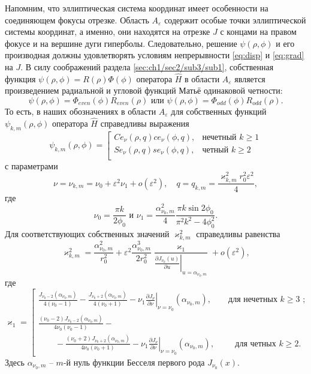 Напомним, что эллиптическая система координат имеет особенности на соединяющем фокусы отрезке. Область $A_\varepsilon$ содержит особые точки эллиптической системы координат, а именно, они находятся на отрезке $J$ с концами на правом фокусе и на вершине дуги гиперболы.
Следовательно, решение $\psi(\rho, \phi)$ и его производная должны удовлетворять условиям непрерывности \eqref{eq:disp} и \eqref{eq:grad} на  $J$.
В силу соображений раздела \ref{sec:ch1/sec2/sub3/sub1}, собственная функция  $\psi(\rho,\phi)=R(\rho) \Phi(\phi)$ оператора $\hat{H}$ в области $A_\varepsilon$ является произведением радиальной и угловой функций Матьё одинаковой четности:
$$ \psi(\rho,\phi) = \Phi_{even}(\phi) R_{even}(\rho)  
\text{ или }
 \psi(\rho,\phi) = \Phi_{odd}(\phi) R_{odd}(\rho) .  $$
То есть, в наших обозначениях в области $A_\varepsilon$ для собственных функций $\psi_{k, m}(\rho, \phi)$ оператора   $\hat{H}$ справедливы выражения
\begin{equation}
\psi_{k, m}(\rho, \phi) = 
\left[
\begin{array}{ll}
    Ce_\nu(\rho, q) ce_\nu(\phi, q) ,   &    \text{нечетный $k \geq 1$}\\
    Se_\nu(\rho, q) se_\nu(\phi, q) ,   &    \text{четный $k \geq 2$}\\
\end{array}
\right.\label{eq:fun}
\end{equation}
с параметрами
\[
\nu = \nu_{k,m} = \nu_0+ \varepsilon^2 \nu_1 + o(\varepsilon^2),  \quad q=q_{k,m} = \dfrac{\varkappa_{k,m}^2 r_0^2 \varepsilon^2}{4},
\]
где
$$\nu_0 = \frac{\pi k}{2\phi_0}\text{\ \  и\  \  }\nu_1=\frac{\alpha_{\nu_0, m}^2}{4} \frac{\pi k \sin 2\phi_0}{\pi^2 k^2 - 4\phi_0^2}  .$$
Для соответствующих собственных  значений  $\varkappa^2_{k, m}$ справедливы равенства
\begin{equation}
\varkappa^2_{k, m} = \dfrac{\alpha_{\nu_0, m}^2}{r_0^2} +
\varepsilon^2 \dfrac{\alpha_{\nu_0, m}^3}{2 r_0^2}\dfrac{\varkappa_1 }{ \left.\frac{\partial J_{\nu_0}(u)}{\partial u}\right|_{u=\alpha_{\nu_0, m}} } + o(\varepsilon^2),\label{eq:val}
\end{equation}
где
\begin{equation*}
    \varkappa_1 = 
    \left[
\begin{array}{ll}
\frac{J_{\nu_0-2}(\alpha_{\nu_0, m})}{4(\nu_0-1)} - \frac{J_{\nu_0+2}(\alpha_{\nu_0, m})}{4(\nu_0+1)} 
  - \nu_1 \left.\frac{\partial J_\nu}{\partial \nu}\right|_{\nu=\nu_0}(\alpha_{\nu_0, m}),\qquad \text{для нечетных $k\geq 3$ ;} \\[10pt]
\frac{(\nu_0 - 2)J_{\nu_0-2}(\alpha_{\nu_0, m})   }{4\nu_0 (\nu_0-1)} -\\
\qquad - \frac{(\nu_0 + 2)J_{\nu_0+2}(\alpha_{\nu_0, m})}{4\nu_0 (\nu_0+1)}  
- \nu_1 \left.\frac{\partial J_\nu}{\partial \nu}\right|_{\nu = \nu_0}(\alpha_{\nu_0, m}), \qquad \ \ \!    \text{для четных $k \geq 2$}.        
\end{array}
\right.
\end{equation*}
Здесь $\alpha_{\nu_0,m}$ --  $m$-й нуль функции Бесселя первого рода $J_{\nu_0}(x)$.


